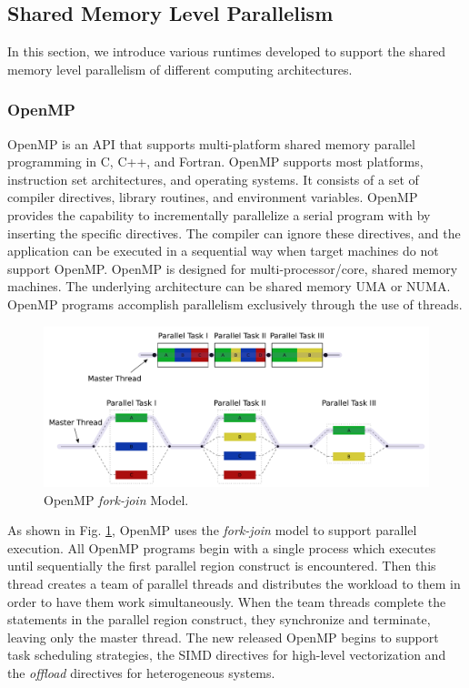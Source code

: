 \subsection{Shared Memory Level Parallelism}

In this section, we introduce various runtimes developed to support the shared memory level parallelism of different computing architectures. 

\subsubsection{OpenMP}

OpenMP \cite{dagum1998openmp} is an API that supports multi-platform shared memory parallel programming in C, C++, and Fortran. OpenMP supports most platforms, instruction set architectures, and operating systems. It consists of a set of compiler directives, library routines, and environment variables. OpenMP provides the capability to incrementally parallelize a serial program with by inserting the specific directives. The compiler can ignore these directives, and the application can be executed in a sequential way when target machines do not support OpenMP. OpenMP is designed for multi-processor/core, shared memory machines. The underlying architecture can be shared memory UMA or NUMA. OpenMP programs accomplish parallelism exclusively through the use of threads.

\begin{figure}[htbp]
	\centering
	\includegraphics[width=6.4in]{fig/Fork_join.pdf}
	\caption{OpenMP \textit{fork-join} Model.}
	\label{openmp_fork_join}
\end{figure}

As shown in Fig. \ref{openmp_fork_join}, OpenMP uses the \textit{fork-join} model to support parallel execution. All OpenMP programs begin with a single process which executes until sequentially the first parallel region construct is encountered.  Then this thread creates a team of parallel threads and distributes the workload to them in order to have them work simultaneously. When the team threads complete the statements in the parallel region construct, they synchronize and terminate, leaving only the master thread. The new released OpenMP begins to support task scheduling strategies, the SIMD directives for high-level vectorization and the \textit{offload} directives for heterogeneous systems.

